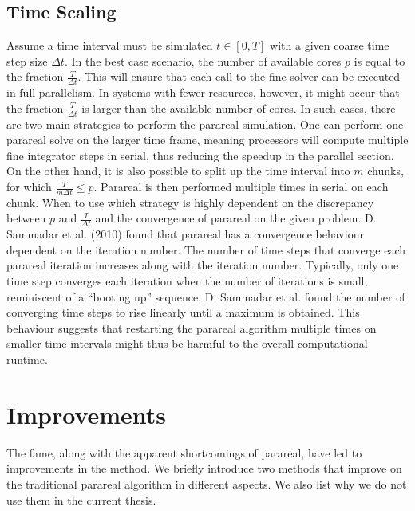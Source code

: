 \subsection{Time Scaling}
Assume a time interval must be simulated $t \in [0, T]$ with a given coarse time step size $\Delta t$. In the best case scenario, the number of available cores $p$ is equal to the fraction $\frac{T}{\Delta t}$. This will ensure that each call to the fine solver can be executed in full parallelism. In systems with fewer resources, however, it might occur that the fraction $\frac{T}{\Delta t}$ is larger than the available number of cores. In such cases, there are two main strategies to perform the parareal simulation. One can perform one parareal solve on the larger time frame, meaning processors will compute multiple fine integrator steps in serial, thus reducing the speedup in the parallel section. On the other hand, it is also possible to split up the time interval into $m$ chunks, for which $\frac{T}{m \Delta t} \le p$. Parareal is then performed multiple times in serial on each chunk. When to use which strategy is highly dependent on the discrepancy between $p$ and $\frac{T}{\Delta t}$ and the convergence of parareal on the given problem. D. Sammadar et al. (2010) \cite{d_samaddar_parallelization_2010} found that parareal has a convergence behaviour dependent on the iteration number. The number of time steps that converge each parareal iteration increases along with the iteration number. Typically, only one time step converges each iteration when the number of iterations is small, reminiscent of a ``booting up'' sequence. D. Sammadar et al. found the number of converging time steps to rise linearly until a maximum is obtained. This behaviour suggests that restarting the parareal algorithm multiple times on smaller time intervals might thus be harmful to the overall computational runtime. 

\section{Improvements}
\label{sec: parareal improvements}
The fame, along with the apparent shortcomings of parareal, have led to improvements in the method. We briefly introduce two methods that improve on the traditional parareal algorithm in different aspects. We also list why we do not use them in the current thesis.
